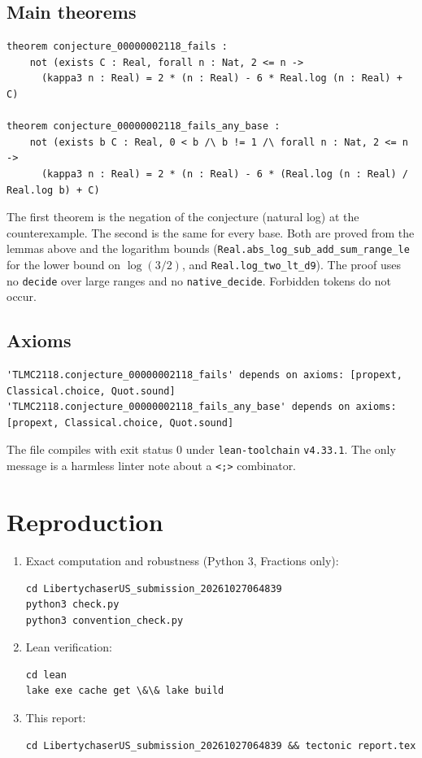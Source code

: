 \documentclass[11pt]{article}
\theoremstyle{definition}
\theoremstyle{plain}
\begin{document}
\subsection*{Main theorems}
\begin{lstlisting}
theorem conjecture_00000002118_fails :
    not (exists C : Real, forall n : Nat, 2 <= n ->
      (kappa3 n : Real) = 2 * (n : Real) - 6 * Real.log (n : Real) + C)

theorem conjecture_00000002118_fails_any_base :
    not (exists b C : Real, 0 < b /\ b != 1 /\ forall n : Nat, 2 <= n ->
      (kappa3 n : Real) = 2 * (n : Real) - 6 * (Real.log (n : Real) / Real.log b) + C)
\end{lstlisting}

\noindent The first theorem is the negation of the conjecture (natural log) at the counterexample. The second is the same
for every base. Both are proved from the lemmas above and the logarithm bounds
(\texttt{Real.abs\_log\_sub\_add\_sum\_range\_le} for the lower bound on $\log(3/2)$, and \texttt{Real.log\_two\_lt\_d9}).
The proof uses no \texttt{decide} over large ranges and no \texttt{native\_decide}. Forbidden tokens do not occur.

\subsection*{Axioms}
\begin{lstlisting}
'TLMC2118.conjecture_00000002118_fails' depends on axioms: [propext, Classical.choice, Quot.sound]
'TLMC2118.conjecture_00000002118_fails_any_base' depends on axioms: [propext, Classical.choice, Quot.sound]
\end{lstlisting}

\noindent The file compiles with exit status 0 under \texttt{lean-toolchain} \texttt{v4.33.1}. The only message is a
harmless linter note about a \texttt{<;>} combinator.

\section{Reproduction}

\begin{enumerate}
\item Exact computation and robustness (Python 3, Fractions only):
\begin{lstlisting}
cd LibertychaserUS_submission_20261027064839
python3 check.py
python3 convention_check.py
\end{lstlisting}
\item Lean verification:
\begin{lstlisting}
cd lean
lake exe cache get \&\& lake build
\end{lstlisting}
\item This report:
\begin{lstlisting}
cd LibertychaserUS_submission_20261027064839 && tectonic report.tex
\end{lstlisting}
\end{enumerate}
\end{document}
